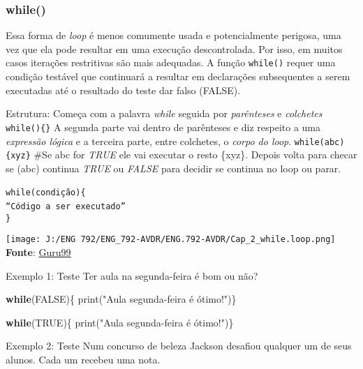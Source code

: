 \documentclass[
]{book}
\newenvironment{Shaded}{\begin{snugshade}}{\end{snugshade}}
\newcommand{\ConstantTok}[1]{\textcolor[rgb]{0.00,0.00,0.00}{#1}}
\newcommand{\ControlFlowTok}[1]{\textcolor[rgb]{0.13,0.29,0.53}{\textbf{#1}}}
\newcommand{\FunctionTok}[1]{\textcolor[rgb]{0.00,0.00,0.00}{#1}}
\newcommand{\NormalTok}[1]{#1}
\newcommand{\StringTok}[1]{\textcolor[rgb]{0.31,0.60,0.02}{#1}}
\begin{document}
\hypertarget{while}{%
\subsubsection{while()}\label{while}}

Essa forma de \emph{loop} é menos comumente usada e potencialmente perigosa, uma vez que ela pode resultar em uma execução descontrolada. Por isso, em muitos casos iterações restritivas são mais adequadas.
A função \texttt{while()} requer uma condição testável que continuará a resultar em declarações subsequentes a serem executadas até o resultado do teste dar falso (FALSE).

Estrutura:
Começa com a palavra \emph{while} seguida por \emph{parênteses} e \emph{colchetes} \texttt{while()\{\}}
A segunda parte vai dentro de parênteses e diz respeito a uma \emph{expressão lógica} e a terceira parte, entre colchetes, o \emph{corpo do loop}.
\texttt{while(abc)\{xyz\}} \#Se abc for \emph{TRUE} ele vai executar o resto \{xyz\}. Depois volta para checar se (abc) continua \emph{TRUE} ou \emph{FALSE} para decidir se continua no loop ou parar.

\texttt{while(condição)\{}~\\
\texttt{“Código\ a\ ser\ executado”}~\\
\texttt{\}}

\texttt{[image: J:/ENG 792/ENG\_792-AVDR/ENG.792-AVDR/Cap\_2\_while.loop.png]}\\
\textbf{Fonte}: \href{https://www.guru99.com/r-while-loop.html}{Guru99}

Exemplo 1: Teste
Ter aula na segunda-feira é bom ou não?

\begin{Shaded}
\begin{Highlighting}[]
\ControlFlowTok{while}\NormalTok{(}\ConstantTok{FALSE}\NormalTok{)\{  }
  \FunctionTok{print}\NormalTok{(}\StringTok{"Aula segunda{-}feira é ótimo!"}\NormalTok{)\}}
\end{Highlighting}
\end{Shaded}

\begin{Shaded}
\begin{Highlighting}[]
\ControlFlowTok{while}\NormalTok{(}\ConstantTok{TRUE}\NormalTok{)\{  }
  \FunctionTok{print}\NormalTok{(}\StringTok{"Aula segunda{-}feira é ótimo!"}\NormalTok{)\}}
\end{Highlighting}
\end{Shaded}

Exemplo 2: Teste
Num concurso de beleza Jackson desafiou qualquer um de seus alunos. Cada um recebeu uma nota.
\end{document}
